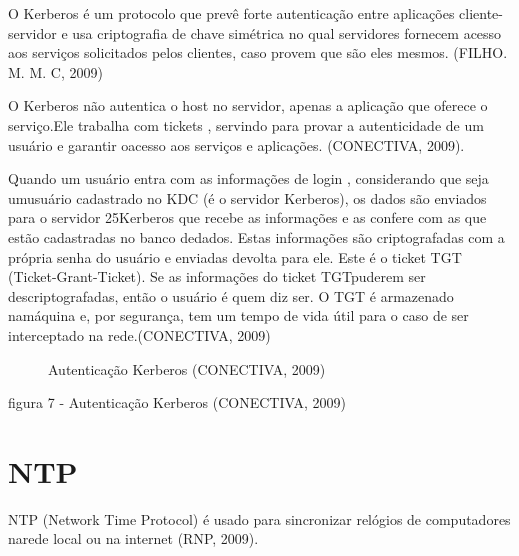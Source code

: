 O Kerberos é um protocolo que prevê forte autenticação entre aplicações cliente-servidor e usa criptografia de chave simétrica no qual servidores fornecem acesso aos serviços solicitados pelos clientes, caso provem que são eles mesmos. (FILHO. M. M. C, 2009)

O Kerberos não autentica o host no servidor, apenas a aplicação que oferece o serviço.Ele trabalha com tickets , servindo para provar a autenticidade de um usuário e garantir oacesso aos serviços e aplicações. (CONECTIVA, 2009).

Quando um usuário entra com as informações de login , considerando que seja umusuário cadastrado no KDC (é o servidor Kerberos), os dados são enviados para o servidor 25Kerberos que recebe as informações e as confere com as que estão cadastradas no banco dedados. Estas informações são criptografadas com a própria senha do usuário e enviadas devolta para ele. Este é o ticket TGT (Ticket-Grant-Ticket). Se as informações do ticket TGTpuderem ser descriptografadas, então o usuário é quem diz ser. O TGT é armazenado namáquina e, por segurança, tem um tempo de vida útil para o caso de ser interceptado na rede.(CONECTIVA, 2009)

\begin{figure}[ht]
   	\centering
   	\caption{Autenticação Kerberos (CONECTIVA, 2009)}
    \label{kerberos}
\end{figure}
figura 7 - Autenticação Kerberos (CONECTIVA, 2009)

\section{NTP}

NTP (Network Time Protocol) é usado para sincronizar relógios de computadores narede local ou na internet (RNP, 2009).

